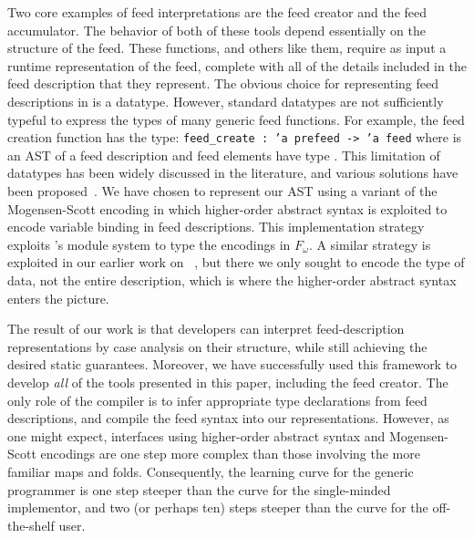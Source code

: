 Two core examples of feed interpretations are the feed creator and the
feed accumulator. The behavior of both of these tools depend
essentially on the structure of the feed. These functions, and others
like them, require as input a runtime representation of the feed,
complete with all of the details included in the feed description that
they represent. The obvious choice for representing feed descriptions
in \ocaml is a datatype. However, standard \ocaml datatypes are not
sufficiently typeful to express the types of many generic feed
functions. For example, the feed creation function has the type:
\texttt{feed\_create : 'a prefeed -> 'a feed}
where  is an AST of a feed description and feed 
elements have type .
%
%
This limitation of datatypes has been widely discussed in the
literature, and various solutions have been 
proposed~\cite{yang:icfp98,weirich:encodingtypecase,hinz:icfp04,padsml-padl}. We have 
chosen to represent our AST using a variant of the Mogensen-Scott
encoding in which higher-order abstract syntax is exploited 
to encode variable binding in feed descriptions.  This implementation strategy 
exploits \ocaml's module system to type the encodings in $F_\omega$. 
A similar strategy is exploited in our earlier work on \padsml~\cite{padsml-padl}, 
but there we only sought to encode the \ocaml type of data, not the entire \padsml
description, which is where the higher-order abstract syntax enters the picture.


The result of our work is that developers
can interpret feed-description representations by case analysis on
their structure, while still achieving the desired static
guarantees. Moreover, we have successfully used this framework to
develop {\it all} of the tools presented in this paper, including the
feed creator. The only role of the compiler is to infer appropriate
type declarations from feed descriptions, and compile the feed syntax
into our representations.  However, as one might expect, interfaces using
higher-order abstract syntax and Mogensen-Scott encodings are one step more
complex than those involving the more familiar maps and folds.  Consequently, the
learning curve for the generic programmer is one step steeper than
the curve for the single-minded implementor, and two (or perhaps ten) steps steeper
than the curve for the off-the-shelf user.

